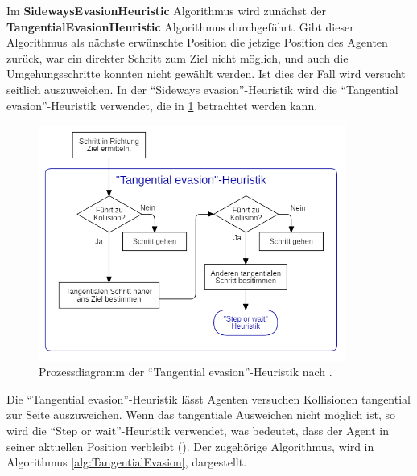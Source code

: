 Im \textbf{SidewaysEvasionHeuristic} Algorithmus wird zunächst der \textbf{TangentialEvasionHeuristic} Algorithmus durchgeführt. Gibt dieser Algorithmus als nächste erwünschte Position die jetzige Position des Agenten zurück, war ein direkter Schritt zum Ziel nicht möglich, und auch die Umgehungsschritte konnten nicht gewählt werden. Ist dies der Fall wird versucht seitlich auszuweichen.
In der "`Sideways evasion"'-Heuristik wird die "`Tangential evasion"'-Heuristik verwendet, die in \ref{fig:tangentialHeuristik} betrachtet werden kann.
\begin{figure}[H]
	\centering
		\includegraphics[width=0.9\textwidth]{pictures/model/algorithm/heuristics/tangential_evasion_heuristic.png}
	\caption{Prozessdiagramm der "`Tangential evasion"'-Heuristik nach \cite{Seitz.2016}.}
	\label{fig:tangentialHeuristik}
\end{figure} 
Die "`Tangential evasion"'-Heuristik lässt Agenten versuchen Kollisionen tangential zur Seite auszuweichen. Wenn das tangentiale Ausweichen nicht möglich ist, so wird die "`Step or wait"'-Heuristik verwendet, was bedeutet, dass der Agent in seiner aktuellen Position verbleibt (\cite{Seitz.2016}). Der zugehörige Algorithmus, wird in Algorithmus \ref{alg:TangentialEvasion}, dargestellt.

